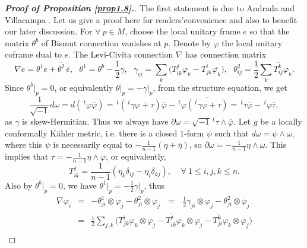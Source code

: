 \documentclass{amsart}
\numberwithin{equation}{section}
\theoremstyle{definition}
\renewcommand{\1}{\mathds{1}}
\renewcommand{\>}{\rightarrow}
\begin{document}
\begin{proof}[{\bf Proof of Proposition \ref{prop1.8}.}]
The first statement is due to Andrada and Villacampa \cite{AndV}. Let us give a proof here for readers'convenience and also to benefit our later discussion.
For $\forall\ p\in M$, choose the local unitary frame $e$
so that the matrix $\theta^b$ of Bismut connection vanishes at $p$.
Denote by $\varphi$ the local unitary coframe dual to $e$.
The Levi-Civita connection $\nabla$ has connection matrix
$$ \nabla e = \theta^1 e + \overline{\theta^2} \,\overline{e}, \ \ \ \theta^1=\theta^b -\frac{1}{2}\gamma , \ \ \
\gamma_{ij} = \sum_k \big( T^j_{ik}\varphi_k - \overline{T_{jk}^i } \overline{\varphi_k} \big) , \ \ \ \theta^2_{ij} = \frac{1}{2}\sum_k \overline{T^k_{ij}} \varphi_k.$$
Since $\theta^b|_p=0$, or equivalently $\theta\big|_p = -\gamma\big|_p$, from the structure equation, we get
$$ \frac{1}{\sqrt{-1}} d \omega = d(\,^t\!\varphi \overline{\varphi }) = \,^t\!(\,^t\!\gamma \varphi +\tau )\overline{\varphi }
- \,^t\!\varphi  \overline{( \,^t\!\gamma \varphi +\tau  ) }=  \,^t\!\tau \overline{\varphi } - \,^t\!\varphi  \overline{\tau  }, $$
as $\gamma$ is skew-Hermitian. Thus we always have $\partial \omega = \sqrt{-1} \,^t\!\tau \wedge \overline{\varphi }$.
Let $g$ be a locally conformally K\"ahler metric,
i.e. there is a closed $1$-form $\psi$ such that $d\omega = \psi \wedge \omega$,
where this $\psi$ is necessarily equal to $-\frac{1}{n-1}(\eta +\overline{\eta})$,
so $\partial \omega = -\frac{1}{n-1}\eta \wedge \omega$. This implies that $\tau = -\frac{1}{n-1}\eta \wedge \varphi$,
or equivalently,
\begin{equation}\label{eq:4.11}
T^j_{ik} = \frac{1}{n-1}(\eta_k \delta_{ij} - \eta_i \delta_{kj}), \ \ \ \ \ \forall \ 1\leq i,j,k\leq n.
\end{equation}
Also by $\theta^b|_p=0$, we have $\theta^1\big|_p=-\frac{1}{2}\gamma\big|_p$, thus
\begin{eqnarray*}
\nabla \varphi_i & = & - \theta^1_{ji} \otimes \varphi_j - \theta^2_{ji} \otimes \overline{\varphi}_j \ \ \ = \ \ \  \frac{1}{2}\gamma_{ji} \otimes \varphi_j - \theta^2_{ji} \otimes \overline{\varphi}_j \\
& = & \frac{1}{2}\sum_{j,k} \big( T^i_{jk} \varphi_k\otimes \varphi_j - \overline{T^j_{ik} } \overline{\varphi}_k \otimes \varphi_j -  \overline{T^k_{ji} } \varphi_k \otimes \overline{\varphi}_j  \big) \\

\end{eqnarray*}
\end{proof}
\end{document}
